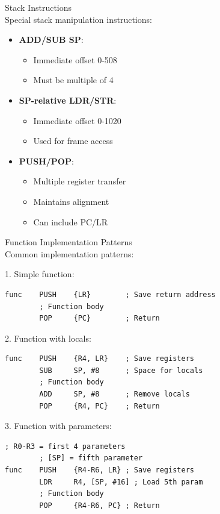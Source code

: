 \begin{concept}{Stack Instructions}\\
Special stack manipulation instructions:
\begin{itemize}
  \item \textbf{ADD/SUB SP}:
    \begin{itemize}
      \item Immediate offset 0-508
      \item Must be multiple of 4
    \end{itemize}
  \item \textbf{SP-relative LDR/STR}:
    \begin{itemize}
      \item Immediate offset 0-1020
      \item Used for frame access
    \end{itemize}
  \item \textbf{PUSH/POP}:
    \begin{itemize}
      \item Multiple register transfer
      \item Maintains alignment
      \item Can include PC/LR
    \end{itemize}
\end{itemize}
\end{concept}

\begin{KR}{Function Implementation Patterns}\\
Common implementation patterns:

1. Simple function:
\begin{lstlisting}[language=armasm, style=base]
func    PUSH    {LR}        ; Save return address
        ; Function body
        POP     {PC}        ; Return
\end{lstlisting}

2. Function with locals:
\begin{lstlisting}[language=armasm, style=base]
func    PUSH    {R4, LR}    ; Save registers
        SUB     SP, #8      ; Space for locals
        ; Function body
        ADD     SP, #8      ; Remove locals
        POP     {R4, PC}    ; Return
\end{lstlisting}

3. Function with parameters:
\begin{lstlisting}[language=armasm, style=base]
        ; R0-R3 = first 4 parameters
        ; [SP] = fifth parameter
func    PUSH    {R4-R6, LR} ; Save registers
        LDR     R4, [SP, #16] ; Load 5th param
        ; Function body
        POP     {R4-R6, PC} ; Return
\end{lstlisting}
\end{KR}


